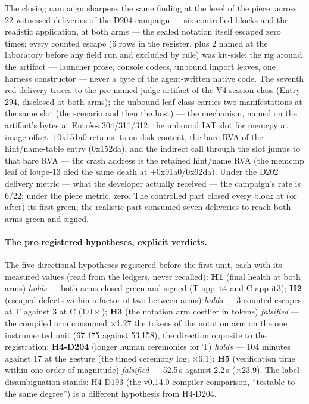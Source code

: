 \documentclass[11pt,a4paper]{article}
\begin{document}
The closing campaign sharpens the same finding at the level of the
piece: across 22 witnessed deliveries of the D204 campaign --- six
controlled blocks and the realistic application, at both arms --- the
sealed notation itself escaped zero times; every counted escape
(6 rows in the register, plus 2 named at the laboratory before any
field run and excluded by rule) was kit-side: the rig around the
artifact --- launcher prose, console codecs, unbound import leaves,
one harness constructor --- never a byte of the agent-written native
code. The seventh red delivery traces to the pre-named judge artifact
of the V4 session class (Entry 294, disclosed at both arms); the
unbound-leaf class carries two manifestations at the same slot (the
scenario and then the host) --- the mechanism, named on the artifact's
bytes at Entr\'ees 304/311/312: the unbound IAT slot for memcpy at
image offset +0x151a0 retains its on-disk content, the bare RVA of the
hint/name-table entry (0x152da), and the indirect call through the
slot jumps to that bare RVA --- the crash address is the retained
hint/name RVA (the memcmp leaf of loupe-13 died the same death at
+0x91a0/0x92da). Under the D202 delivery metric --- what the developer
actually received --- the campaign's rate is 6/22; under the piece
metric, zero. The controlled part closed every block at (or after) its
first green; the realistic part consumed seven deliveries to reach
both arms green and signed.

\paragraph{The pre-registered hypotheses, explicit verdicts.} The five
directional hypotheses registered before the first unit, each with its
measured values (read from the ledgers, never recalled): \textbf{H1}
(final health at both arms) \emph{holds} --- both arms closed green
and signed (T-app-it4 and C-app-it3); \textbf{H2} (escaped defects
within a factor of two between arms) \emph{holds} --- 3 counted
escapes at T against 3 at C ($1.0\times$); \textbf{H3} (the notation
arm costlier in tokens) \emph{falsified} --- the compiled arm consumed
$\times$1.27 the tokens of the notation arm on the one instrumented
unit (67{,}475 against 53{,}158), the direction opposite to the
registration; \textbf{H4-D204} (longer human ceremonies for T)
\emph{holds} --- 104 minutes against 17 at the gesture (the timed
ceremony log; $\times$6.1); \textbf{H5} (verification time within one
order of magnitude) \emph{falsified} --- 52.5\,s against 2.2\,s
($\times$23.9). The label disambiguation stands: H4-D193 (the
v0.14.0 compiler comparison, ``testable to the same degree'') is a
different hypothesis from H4-D204.
\end{document}
